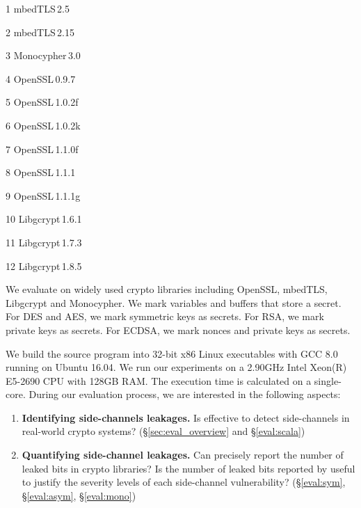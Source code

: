 \begin{table}[]
\begin{tablenotes}
    \item[1] mbedTLS\,2.5  ~~~~\item[2] mbedTLS\,2.15 ~\item[3] Monocypher\,3.0 \\
    \item[4] OpenSSL\,0.9.7  ~~\item[5] OpenSSL\,1.0.2f  \item[6] OpenSSL\,1.0.2k \\
    \item[7] OpenSSL\,1.1.0f ~\item[8] OpenSSL\,1.1.1 ~\item[9] OpenSSL\,1.1.1g \\
    \item[10] Libgcrypt\,1.6.1 \item[11] Libgcrypt\,1.7.3 \item[12] Libgcrypt\,1.8.5\\
\end{tablenotes}
\vspace*{-20pt}

\end{table}

We evaluate \tool{} on widely used crypto libraries including OpenSSL, mbedTLS, Libgcrypt and Monocypher\@. 
We mark variables and buffers that store a secret.
For DES and AES, we mark symmetric keys as secrets. 
For RSA, we mark private keys as secrets. For ECDSA, 
we mark nonces and private keys as secrets.

We build the source program into 32-bit x86 Linux executables with GCC 8.0
running on Ubuntu 16.04. 
We run our experiments on a 2.90GHz Intel Xeon(R) E5-2690 CPU with 128GB
RAM. The execution time is calculated on a single-core.
During our evaluation process, we are interested in the following
aspects:
\begin{enumerate}
    \item  \textbf{Identifying side-channels leakages.}
          Is \tool{} effective to detect side-channels in real-world crypto
          systems? (\S\ref{sec:eval_overview} and \S\ref{eval:scala})
    \item  \textbf{Quantifying side-channel leakages.}
          Can \tool{} precisely report the number of leaked bits in crypto
          libraries? Is the number of leaked bits reported by \tool{} useful
          to justify the severity levels of each side-channel vulnerability?
          (\S\ref{eval:sym}, \S\ref{eval:asym}, \S\ref{eval:mono})
\end{enumerate}


